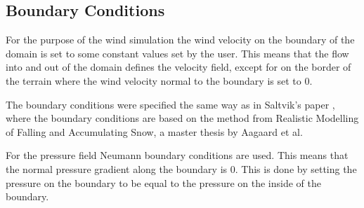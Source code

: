 \subsection{Boundary Conditions}

For the purpose of the wind simulation the wind velocity on the boundary of the
domain is set to some constant values set by the user. This means that the flow
into and out of the domain defines the velocity field, except for on the border
of the terrain where the wind velocity normal to the boundary is set to 0.

The boundary conditions were specified the same way as in Saltvik's paper
\cite{originalSnowThesis}, where the boundary conditions are based 
on the method from Realistic Modelling of Falling and Accumulating Snow, a master
thesis by Aagaard et al\cite{danishSnowThesis}. 

For the pressure field Neumann boundary conditions are used. This means that
the normal pressure gradient along the boundary is 0. This is done by setting
the pressure on the boundary to be equal to the pressure on the inside of the 
boundary.
